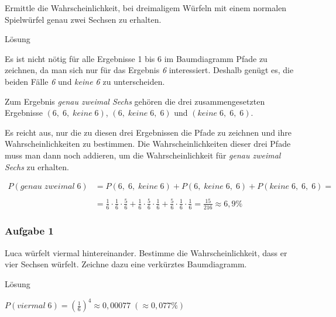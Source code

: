 \documentclass[
  ngerman,
]{book}
\begin{document}
Ermittle die Wahrscheinlichkeit, bei dreimaligem Würfeln mit einem normalen Spielwürfel genau zwei Sechsen zu erhalten.

Lösung

Es ist nicht nötig für alle Ergebnisse 1 bis 6 im Baumdiagramm Pfade zu zeichnen, da man sich nur für das Ergebnis \emph{6} interessiert. Deshalb genügt es, die beiden Fälle \emph{6} und \emph{keine 6} zu unterscheiden.

Zum Ergebnis \emph{genau zweimal Sechs} gehören die drei zusammengesetzten Ergebnisse \((6,\;6,\;keine\;6)\), \((6,\;keine\;6,\;6)\) und \((keine\;6,\;6,\;6)\).

Es reicht aus, nur die zu diesen drei Ergebnissen die Pfade zu zeichnen und ihre Wahrscheinlichkeiten zu bestimmen. Die Wahrscheinlichkeiten dieser drei Pfade muss man dann noch addieren, um die Wahrscheinlichkeit für \emph{genau zweimal Sechs} zu erhalten.

\[\begin{align}
P(genau\;zweimal\;6) &= P(6,\;6,\;keine\;6) + P(6,\;keine\;6,\;6) + P(keine\;6,\;6,\;6) =\\
{}\\
&= \frac{1}{6} \cdot \frac{1}{6} \cdot \frac{5}{6} + \frac{1}{6} \cdot \frac{5}{6} \cdot \frac{1}{6} + \frac{5}{6} \cdot \frac{1}{6} \cdot \frac{1}{6} = \frac{15}{216} \approx 6,9\%
\end{align}\]

\hypertarget{section-155}{%
\subsubsection*{}\label{section-155}}

\hypertarget{aufgabe-1-16}{%
\subsubsection*{Aufgabe 1}\label{aufgabe-1-16}}

Luca würfelt viermal hintereinander. Bestimme die Wahrscheinlichkeit, dass er vier Sechsen würfelt. Zeichne dazu eine verkürztes Baumdiagramm.

Lösung

\(P(viermal\;6)=(\frac{1}{6})^4 \approx 0,00077\; (\approx 0,077\%)\)

\hypertarget{section-156}{%
\subsubsection*{}\label{section-156}}
\end{document}
